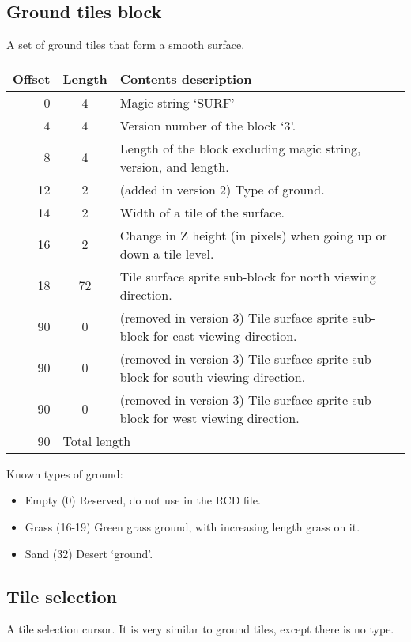 \documentclass{article}
\begin{document}
\subsection{Ground tiles block}
A set of ground tiles that form a smooth surface.

\begin{center}
\begin{tabular}{|r|c|l|} \hline
\textbf{Offset} & \textbf{Length} & \textbf{Contents description} \\ \hline
   0 &  4 & Magic string `SURF' \\
   4 &  4 & Version number of the block `3'. \\
   8 &  4 & Length of the block excluding magic string, version, and length. \\
  12 &  2 & (added in version 2) Type of ground. \\
  14 &  2 & Width of a tile of the surface. \\
  16 &  2 & Change in Z height (in pixels) when going up or down a tile level. \\
  18 & 72 & Tile surface sprite sub-block for north viewing direction. \\
  90 &  0 & (removed in version 3) Tile surface sprite sub-block for east viewing direction. \\
  90 &  0 & (removed in version 3) Tile surface sprite sub-block for south viewing direction. \\
  90 &  0 & (removed in version 3) Tile surface sprite sub-block for west viewing direction. \\ \hline
  90 & \multicolumn{2}{l|}{Total length} \\ \hline
\end{tabular}
\end{center}

\medskip
\noindent
Known types of ground:
\begin{itemize}
\item Empty (0) Reserved, do not use in the RCD{} file.
\item Grass (16-19) Green grass ground, with increasing length grass on it.
\item Sand  (32) Desert `ground'.
\end{itemize}

\subsection{Tile selection}
A tile selection cursor. It is very similar to ground tiles, except there is
no type.
\end{document}
